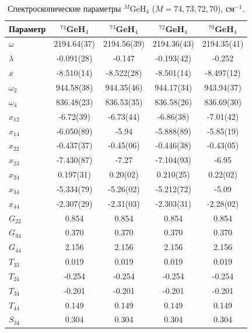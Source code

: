 \begin{table}[htbp]
\centering
\scriptsize
\caption{Спектроскопические параметры ${}^{M}$GeH$_4$ ($M=74,73,72,70$), см$^{-1}$.}
\label{tab:ge_parameters_isotopologues}
\begin{tabular}{lcccc}
\toprule
Параметр & ${}^{74}$GeH$_4$ & ${}^{73}$GeH$_4$ & ${}^{72}$GeH$_4$ & ${}^{70}$GeH$_4$ \\
\midrule
$\omega$ & 2194.64(37) & 2194.56(39) & 2194.36(43) & 2194.35(41) \\
$\lambda$ & -0.091(28) & -0.147 & -0.193(42) & -0.252 \\
$x$ & -8.510(14) & -8.522(28) & -8.501(14) & -8.497(12) \\
$\omega_2$ & 944.58(38) & 944.35(46) & 944.17(34) & 943.94(37) \\
$\omega_4$ & 836.48(23) & 836.53(35) & 836.58(26) & 836.69(30) \\
$x_{12}$ & -6.72(39) & -6.73(44) & -6.86(38) & -7.01(42) \\
$x_{14}$ & -6.050(89) & -5.94 & -5.888(89) & -5.85(19) \\
$x_{22}$ & -0.437(37) & -0.45(06) & -0.446(38) & -0.43(05) \\
$x_{23}$ & -7.430(87) & -7.27 & -7.104(93) & -6.95 \\
$x_{24}$ & 0.197(31) & 0.20(02) & 0.210(25) & 0.22(02) \\
$x_{34}$ & -5.334(79) & -5.26(02) & -5.212(72) & -5.09 \\
$x_{44}$ & -2.307(29) & -2.31(03) & -2.303(31) & -2.28(02) \\
$G_{22}$ & 0.854 & 0.854 & 0.854 & 0.854 \\
$G_{34}$ & 0.370 & 0.370 & 0.370 & 0.370 \\
$G_{44}$ & 2.156 & 2.156 & 2.156 & 2.156 \\
$T_{23}$ & 0.019 & 0.019 & 0.019 & 0.019 \\
$T_{24}$ & -0.254 & -0.254 & -0.254 & -0.254 \\
$T_{34}$ & -0.201 & -0.201 & -0.201 & -0.201 \\
$T_{44}$ & 0.149 & 0.149 & 0.149 & 0.149 \\
$S_{34}$ & 0.304 & 0.304 & 0.304 & 0.304 \\
\bottomrule
\end{tabular}
\end{table}
